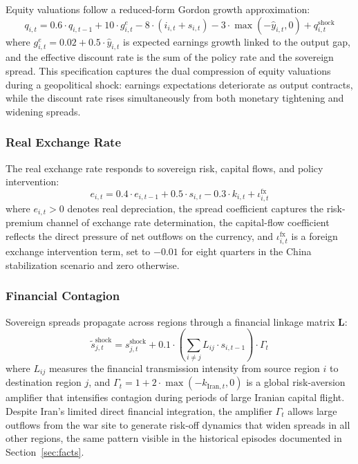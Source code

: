 \documentclass[12pt]{article}
\begin{document}
Equity valuations follow a reduced-form Gordon growth approximation:
\begin{equation}
q_{i,t} = 0.6 \cdot q_{i,t-1} + 10 \cdot g^e_{i,t} - 8 \cdot (i_{i,t} + s_{i,t}) - 3 \cdot \max(-\hat{y}_{i,t}, 0) + q^{\text{shock}}_{i,t}
\label{eq:equity}
\end{equation}
where $g^e_{i,t} = 0.02 + 0.5 \cdot \hat{y}_{i,t}$ is expected earnings growth linked to the output gap, and the effective discount rate is the sum of the policy rate and the sovereign spread. This specification captures the dual compression of equity valuations during a geopolitical shock: earnings expectations deteriorate as output contracts, while the discount rate rises simultaneously from both monetary tightening and widening spreads.

\subsubsection{Real Exchange Rate}

The real exchange rate responds to sovereign risk, capital flows, and policy intervention:
\begin{equation}
e_{i,t} = 0.4 \cdot e_{i,t-1} + 0.5 \cdot s_{i,t} - 0.3 \cdot k_{i,t} + \iota^{\text{fx}}_{i,t}
\label{eq:rer}
\end{equation}
where $e_{i,t} > 0$ denotes real depreciation, the spread coefficient captures the risk-premium channel of exchange rate determination, the capital-flow coefficient reflects the direct pressure of net outflows on the currency, and $\iota^{\text{fx}}_{i,t}$ is a foreign exchange intervention term, set to $-0.01$ for eight quarters in the China stabilization scenario and zero otherwise.

\subsubsection{Financial Contagion}

Sovereign spreads propagate across regions through a financial linkage matrix $\mathbf{L}$:
\begin{equation}
\tilde{s}^{\text{shock}}_{j,t} = s^{\text{shock}}_{j,t} + 0.1 \cdot \left(\sum_{i \neq j} L_{ij} \cdot s_{i,t-1}\right) \cdot \Gamma_t
\label{eq:contagion}
\end{equation}
where $L_{ij}$ measures the financial transmission intensity from source region $i$ to destination region $j$, and $\Gamma_t = 1 + 2 \cdot \max(-k_{\text{Iran},t}, 0)$ is a global risk-aversion amplifier that intensifies contagion during periods of large Iranian capital flight. Despite Iran's limited direct financial integration, the amplifier $\Gamma_t$ allows large outflows from the war site to generate risk-off dynamics that widen spreads in all other regions, the same pattern visible in the historical episodes documented in Section~\ref{sec:facts}.
\end{document}
